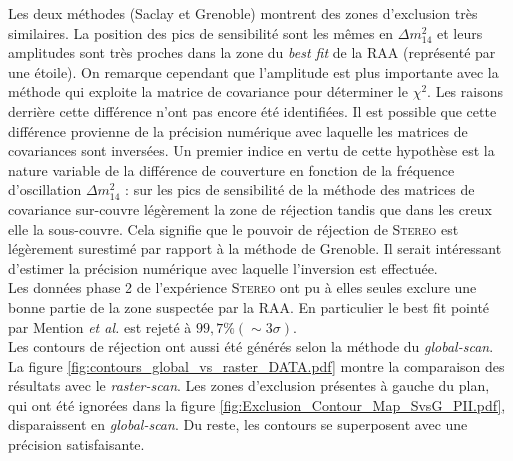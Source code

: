 Les deux méthodes (Saclay et Grenoble) montrent des zones d'exclusion très similaires. La position des pics de sensibilité sont les mêmes en $\Delta m_{14}^2$ et leurs amplitudes sont très proches dans la zone du \textit{best fit} de la RAA (représenté par une étoile). On remarque cependant que l'amplitude est plus importante avec la méthode qui exploite la matrice de covariance pour déterminer le $\chi^2$. Les raisons derrière cette différence n'ont pas encore été identifiées. Il est possible que cette différence provienne de la précision numérique avec laquelle les matrices de covariances sont inversées. Un premier indice en vertu de cette hypothèse est la nature variable de la différence de couverture en fonction de la fréquence d'oscillation $\Delta m_{14}^2$ : sur les pics de sensibilité de la méthode des matrices de covariance sur-couvre légèrement la zone de réjection tandis que dans les creux elle la sous-couvre. Cela signifie que le pouvoir de réjection de \textsc{Stereo} est légèrement surestimé par rapport à la méthode de Grenoble. Il serait intéressant d'estimer la précision numérique avec laquelle l'inversion est effectuée.\\

Les données phase 2 de l'expérience \textsc{Stereo} ont pu à elles seules exclure une bonne partie de la zone suspectée par la RAA. En particulier le best fit pointé par Mention \textit{et al.} \cite{Mention:2011rk} est rejeté à $99,7 \% (\sim 3\sigma)$.\\


Les contours de réjection ont aussi été générés selon la méthode du \textit{global-scan}. La figure \ref{fig:contours_global_vs_raster_DATA.pdf} montre la comparaison des résultats avec le \textit{raster-scan}. Les zones d'exclusion présentes à gauche du plan, qui ont été ignorées dans la figure \ref{fig:Exclusion_Contour_Map_SvsG_PII.pdf}, disparaissent en \textit{global-scan}. Du reste, les contours se superposent avec une précision satisfaisante.\\


